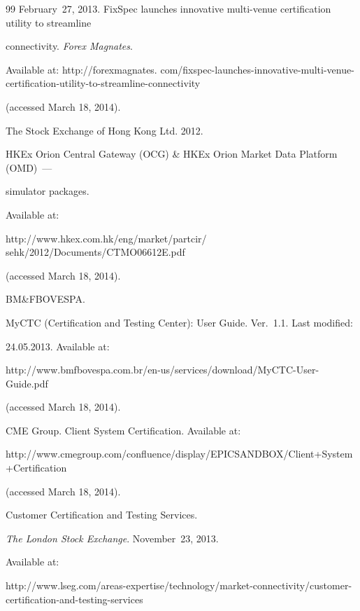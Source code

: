 {{\begin{thebibliography}{99}
February~27, 2013. FixSpec launches innovative multi-venue certification utility to streamline


connectivity. \textit{Forex Magnates}.


Available at: {\sf http://forexmagnates. com/fixspec-launches-innovative-multi-venue-certification-utility-to-streamline-connectivity}


(accessed March 18, 2014).







{The Stock Exchange of Hong Kong Ltd}. 2012.


HKEx Orion Central Gateway (OCG) \& HKEx Orion Market Data Platform (OMD)~---


simulator packages.


Available at: {\sf


http://www.hkex.com.hk/eng/market/partcir/ sehk/2012/Documents/CTMO06612E.pdf}


(accessed March 18, 2014).







BM\&FBOVESPA.


MyCTC (Certification and Testing Center): User Guide. Ver.~1.1. Last modified:


24.05.2013.  Available at: {\sf


http://www.bmfbovespa.com.br/en-us/services/download/MyCTC-User-Guide.pdf}


(accessed March 18, 2014).







CME Group. Client System Certification.  Available at: {\sf


http://www.cmegroup.\linebreak com/confluence/display/EPICSANDBOX/Client+System+Certification}


(accessed March 18, 2014).







Customer Certification and Testing Services.


\textit{The London Stock Exchange}. November~23,  2013.


Available at:  {\sf


http://www.lseg.com/areas-expertise/technology/market-connectivity/customer-certification-and-testing-services}



\end{thebibliography}}}
